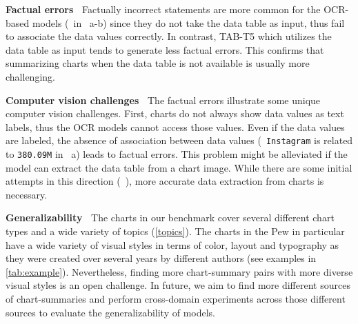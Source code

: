 \vspace{0.5em}
\noindent \textbf{Factual errors~} 
Factually incorrect statements are more common for the OCR-based models (\eg\ 
in ~a-b) since they do not take the data table as input, thus fail to associate the data values correctly. In contrast, TAB-T5 which utilizes the data table as input tends to 
generate less factual errors.
This confirms that summarizing charts when the data table is not available is usually more challenging. 
 

\vspace{0.5em}
\noindent \textbf{Computer vision challenges~} The factual errors  illustrate some unique computer vision challenges. First, charts do not always show data values as text labels, 
thus the OCR models cannot access those 
values. Even if the  data values are labeled, the absence of association between data values (\eg\ \texttt{Instagram} is related to \texttt{380.09M} 
in ~\Cref{tab:examples}a) leads to factual errors. 
This problem might be alleviated if the model can extract the data table from a chart image. While there are some initial attempts in this direction (\eg\ \citet{ChartOCR,  Choi2019VisualizingFT}), 
more accurate data extraction from charts is necessary. 

\vspace{0.5em}
{\noindent \textbf{Generalizability~} The charts in our benchmark cover several different chart types and a wide variety of topics (\cref{topics}). The charts in the Pew in particular have a wide variety of visual styles in terms of color, layout and typography as they were created over several years by different authors (see examples in \cref{tab:example}). Nevertheless,  finding more chart-summary pairs with more diverse visual styles is  an open challenge. In future, we aim to find more different sources of chart-summaries and perform cross-domain experiments across those different sources to evaluate the generalizability of models.}







